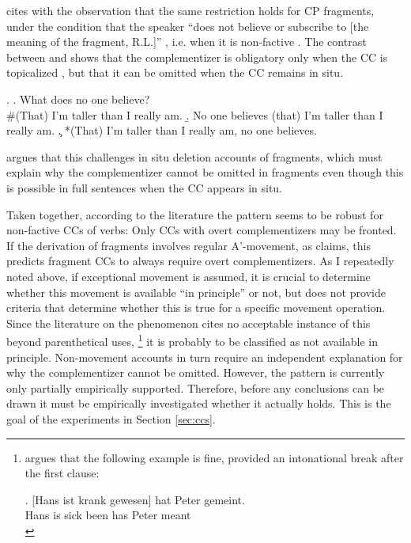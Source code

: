 \citet{merchant2004} cites \citet{morgan1973} with the observation that the same restriction holds for CP fragments, under the condition that the speaker ``does not believe or subscribe to [the meaning of the fragment, R.L.]'' \citep[690]{merchant2004}, i.e. when it is non-factive \Next[a]. The contrast between \Next[b] and \Next[c] shows that the complementizer is obligatory only when the CC is topicalized \Next[c], but that it can be omitted when the CC remains in situ. 

\ex.
\a. What does no one believe? \hfill \citep[690]{merchant2004}\\
\mbox{}\hspace{-.45em}\#(That) I’m taller than I really am.
\b. No one believes (that) I'm taller than I really am. \label{ex:merchant-cc-insitu}
\c. *(That) I’m taller than I really am, no one believes. \label{ex:merchant-cc-fronted}

\begin{sloppypar}\noindent
\citeauthor{merchant2004} argues that this challenges in situ deletion accounts of fragments, which must explain why the complementizer cannot be omitted in fragments even though this is possible in full sentences when the CC appears in situ.\end{sloppypar}

Taken together, according to the literature the pattern seems to be robust for non-factive CCs of verbs: Only CCs with overt complementizers may be fronted. If the derivation of fragments involves regular A'-movement, as \citet{merchant2004} claims, this predicts fragment CCs to always require overt complementizers. As I repeatedly noted above, if exceptional movement is assumed, it is crucial to determine whether this movement is available ``in principle'' or not, but \citet{weir2014} does not provide criteria that determine whether this is true for a specific movement operation. Since the literature on the phenomenon cites no acceptable instance of this beyond parenthetical uses,%
\footnote{\citet{webelhuth1992} argues that the following example is fine, provided an intonational break after the first clause:

\exg. [Hans ist krank gewesen] hat Peter gemeint.\\
Hans is sick been has Peter meant\\
 

}\afterfn%
%
it is probably to be classified as not available in principle. Non-movement accounts in turn require an independent explanation for why the complementizer cannot be omitted. However, the pattern is currently only partially empirically supported. Therefore, before any conclusions can be drawn it must be empirically investigated whether it actually holds. This is the goal of the experiments in Section \ref{sec:ccs}. 


